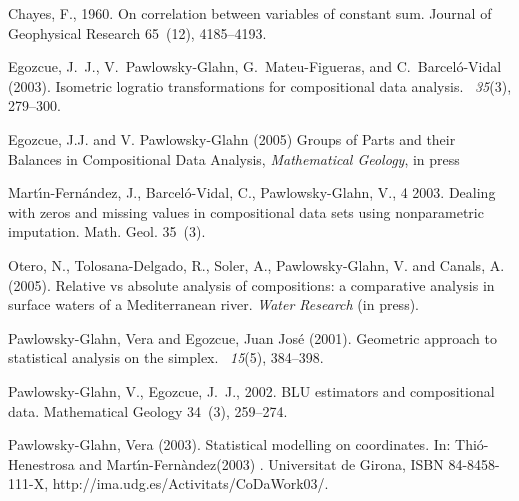 \documentclass{article}
\begin{document}
\begin{thebibliography}{99}
Chayes, F., 1960. On correlation between variables of constant
sum. Journal of Geophysical Research 65~(12), 4185--4193.


Egozcue, J.~J., V.~Pawlowsky-Glahn, G.~Mateu-Figueras, and
C.~Barcel\'o-Vidal
  (2003).
\newblock Isometric logratio transformations for compositional data analysis.
~{\em 35\/}(3), 279--300.

 Egozcue, J.J. and
  V. Pawlowsky-Glahn (2005) Groups of Parts and their Balances in
  Compositional Data Analysis, {\em Mathematical Geology}, in press


  Mart\'{\i}n-Fern\'andez, J., Barcel\'o-Vidal, C., Pawlowsky-Glahn,
  V., 4 2003. Dealing with zeros and missing values in compositional
  data sets using nonparametric imputation. Math. Geol. 35~(3).

Otero, N., Tolosana-Delgado, R., Soler, A., Pawlowsky-Glahn, V. and Canals, A. (2005).
Relative vs absolute analysis of compositions: a comparative analysis in surface waters of a Mediterranean river.
{\em Water Research} (in press).

Pawlowsky-Glahn, Vera and Egozcue, Juan Jos\'e (2001).
\newblock Geometric approach to statistical analysis on the simplex.
~{\em 15\/}(5), 384--398.

Pawlowsky-Glahn, V., Egozcue, J.~J., 2002. {BLU} estimators and
compositional data. Mathematical Geology 34~(3), 259--274.

Pawlowsky-Glahn, Vera (2003).
\newblock Statistical modelling on coordinates.
\newblock In: Thi{\'o}-Henestrosa and Mart{\'\i}n-Fern{\`a}ndez(2003)
. Universitat de Girona, {ISBN} 84-8458-111-X,
  http://ima.udg.es/Activitats/CoDaWork03/.
  

\end{thebibliography}
\end{document}
